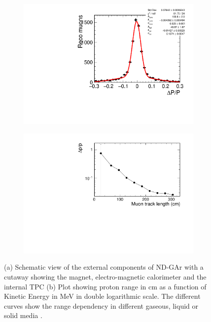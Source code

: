 \begin{figure}[t]
     \centering
     \begin{subfigure}[b]{0.7\textwidth}
         \centering
         \includegraphics[width=\textwidth]{figures/ch3-DUNE/dpmuon.pdf}
         \caption{}
         \label{fig:GArTPCdp}
     \end{subfigure}
     \hfill
     \begin{subfigure}[b]{0.7\textwidth}
         \centering
         \includegraphics[width=\textwidth]{figures/ch3-DUNE/muonpoverpfunc.pdf}
         \caption{}
         \label{fig:GArTPCdpoverp}
     \end{subfigure}
        \caption{(a) Schematic view of the external components of ND-GAr with a cutaway showing the magnet, electro-magnetic calorimeter and the internal TPC  (b) Plot showing proton range in cm as a function of Kinetic Energy in MeV in double logarithmic scale. The different curves show the range dependency in different gaseous, liquid or solid media \cite{Lu}. }
        \label{fig:GARTPCdp}
\end{figure}

